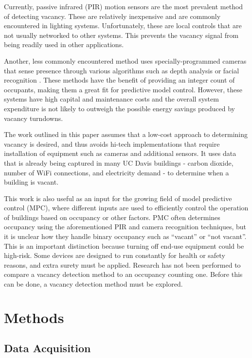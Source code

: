 \documentclass[letterpaper, 12 pt, conference]{ieeeconf}  %
\begin{document}
Currently, passive infrared (PIR) motion sensors are the most prevalent method of detecting vacancy. These are relatively inexpensive and are commonly encountered in lighting systems. Unfortunately, these are local controls that are not usually networked to other systems. This prevents the vacancy signal from being readily used in other applications.

Another, less commonly encountered method uses specially-programmed cameras that sense presence through various algorithms such as depth analysis \cite{Petersen} or facial recognition \cite{Viola}. These methods have the benefit of providing an integer count of occupants, making them a great fit for predictive model control. However, these systems have high capital and maintenance costs and the overall system expenditure is not likely to outweigh the possible energy savings produced by vacancy turndowns.

The work outlined in this paper assumes that a low-cost approach to determining vacancy is desired, and thus avoids hi-tech implementations that require installation of equipment such as cameras and additional sensors. It uses data that is already being captured in many UC Davis buildings - carbon dioxide, number of WiFi connections, and electricity demand - to determine when a building is vacant.

This work is also useful as an input for the growing field of model predictive control (MPC), where different inputs are used to efficiently control the operation of buildings based on occupancy or other factors. PMC often determines occupancy using the aforementioned PIR and camera recognition techniques, but it is unclear how they handle binary occupancy such as “vacant” or “not vacant”. This is an important distinction because turning off end-use equipment could be high-risk. Some devices are designed to run constantly for health or safety reasons, and extra surety must be applied. Research has not been performed to compare a vacancy detection method to an occupancy counting one. Before this can be done, a vacancy detection method must be explored.


\section{Methods}

\subsection{Data Acquisition}
\end{document}
